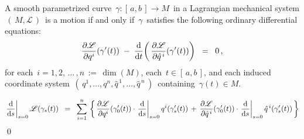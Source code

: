 \vskip 0.5cm
\begin{proposition}
\label{EulerLagrangeEquations}
\mbox{}
\vskip 0.1cm
\noindent
A smooth parametrized curve
\,$\gamma : [\,a,b\,] \longrightarrow M$\,
in a Lagrangian mechanical system
\,$\left(\,M,\mathscr{L}\,\right)$\,
is a motion if and only if
\,$\gamma$\,
satisfies the following ordinary differential equations:
\begin{equation*}
\dfrac{\partial\mathscr{L}}{\partial q^{i}}\!\left(\gamma^{\prime}(t)\right)
\; - \;
\dfrac{\textnormal{d}}{\textnormal{d} t}\!\left(\,\dfrac{\partial\mathscr{L}}{\partial \hat{q}^{\,i}}\!\left(\gamma^{\prime}(t)\right)\right)
\;\; = \;\;
0\,,
\end{equation*}
for each \,$i = 1, 2, \,\ldots\, , n \,:=\, \dim(M)$,
each \,$t \in [\,a,b\,]$, and
each induced coordinate system \,$\left(\,q^{1},\ldots,q^{n},\hat{q}^{\,1},\ldots,\hat{q}^{\,n}\,\right)$\,
containing \,$\gamma(t) \in M$.
\end{proposition}
\proof
\begin{equation*}
\left.\dfrac{\textnormal{d}}{\textnormal{d} s}\right\vert_{s=0} \mathscr{L}\!\left(\gamma_{s}(t)\right)
\;\; = \;\;
	\overset{n}{\underset{i=1}{\sum}}\,\left\{\,
		\dfrac{\partial\mathscr{L}}{\partial q^{i}}\!\left(\gamma^{\prime}_{0}(t)\right)
		\cdot
		\left.\dfrac{\textnormal{d}}{\textnormal{d} s}\right\vert_{s=0} q^{i}(\gamma^{\prime}_{s}(t))
		\, + \,
		\dfrac{\partial\mathscr{L}}{\partial\hat{q}^{\,i}}\!\left(\gamma^{\prime}_{0}(t)\right)
		\cdot
		\left.\dfrac{\textnormal{d}}{\textnormal{d} s}\right\vert_{s=0} \hat{q}^{\,i}(\gamma^{\prime}_{s}(t))
		\,\right\}
\end{equation*}
\qed




